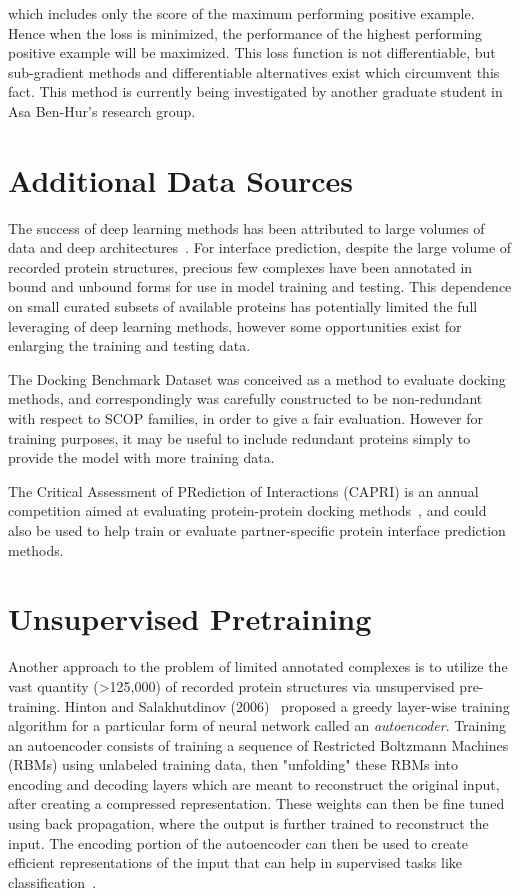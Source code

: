 \noindent
which includes only the score of the maximum performing positive example.
Hence when the loss is minimized, the performance of the highest performing positive example will be maximized.
This loss function is not differentiable, but sub-gradient methods and differentiable alternatives exist which circumvent this fact.
This method is currently being investigated by another graduate student in Asa Ben-Hur's research group.

\section{Additional Data Sources}

The success of deep learning methods has been attributed to large volumes of data and deep architectures~\cite{krizhevsky2012}.
For interface prediction, despite the large volume of recorded protein structures, precious few complexes have been annotated in bound and unbound forms for use in model training and testing. 
This dependence on small curated subsets of available proteins has potentially limited the full leveraging of deep learning methods, however some opportunities exist for enlarging the training and testing data.

The Docking Benchmark Dataset was conceived as a method to evaluate docking methods, and correspondingly was carefully constructed to be non-redundant with respect to SCOP families, in order to give a fair evaluation. 
However for training purposes, it may be useful to include redundant proteins simply to provide the model with more training data. 

The Critical Assessment of PRediction of Interactions (CAPRI) is an annual competition aimed at evaluating protein-protein docking methods~\cite{janin2003}, and could also be used to help train or evaluate partner-specific protein interface prediction methods. 

\section{Unsupervised Pretraining}

Another approach to the problem of limited annotated complexes is to utilize the vast quantity (>125,000) of recorded protein structures via unsupervised pre-training.
Hinton and Salakhutdinov (2006)~\cite{hinton2006b} proposed a greedy layer-wise training algorithm for a particular form of neural network called an \emph{autoencoder}.
Training an autoencoder consists of training a sequence of Restricted Boltzmann Machines (RBMs) using unlabeled training data, then "unfolding" these RBMs into encoding and decoding layers which are meant to reconstruct the original input, after creating a compressed representation. 
These weights can then be fine tuned using back propagation, where the output is further trained to reconstruct the input.
The encoding portion of the autoencoder can then be used to create efficient representations of the input that can help in supervised tasks like classification~\cite{hinton2006b, bengio2007}.

